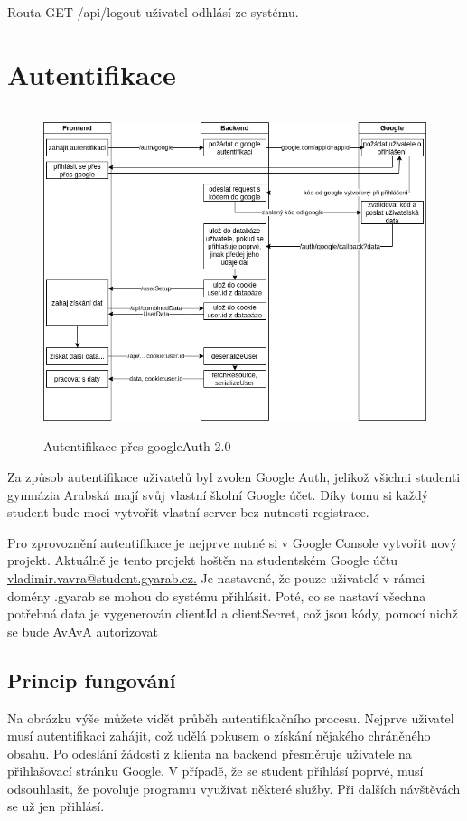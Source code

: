 \documentclass[a4paper,oneside,12pt]{report}
\begin{document}
Routa GET /api/logout uživatel odhlásí ze systému.


\section{Autentifikace}

\begin{figure}[h]
	\centering
	\includegraphics[height=9.5cm]{../img/authentication.png}
	\caption[Autentifikace přes googleAuth 2.0, vlastní tvorba]{Autentifikace přes googleAuth 2.0}
	\label{fig:architecture}
\end{figure}

Za způsob autentifikace uživatelů byl zvolen Google Auth, jelikož všichni studenti gymnázia Arabská mají svůj vlastní školní Google účet. Díky tomu si každý student bude moci vytvořit vlastní server bez nutnosti registrace.

Pro zprovoznění autentifikace je nejprve nutné si v Google Console vytvořit nový projekt.
Aktuálně je tento projekt hoštěn na studentském Google účtu \url{vladimir.vavra@student.gyarab.cz.} %
Je nastavené, že pouze uživatelé v rámci domény .gyarab se mohou do systému přihlásit.
Poté, co se nastaví všechna potřebná data je vygenerován clientId a clientSecret, což jsou kódy, pomocí nichž se bude AvAvA autorizovat

\subsection{Princip fungování}

Na obrázku výše můžete vidět průběh autentifikačního procesu.
Nejprve uživatel musí autentifikaci zahájit, což udělá pokusem o získání nějakého chráněného obsahu.
Po odeslání žádosti z klienta na backend přesměruje uživatele na přihlašovací stránku Google.
V případě, že se student přihlásí poprvé, musí odsouhlasit, že povoluje programu využívat některé služby.
Při dalších návštěvách se už jen přihlásí.
\end{document}
